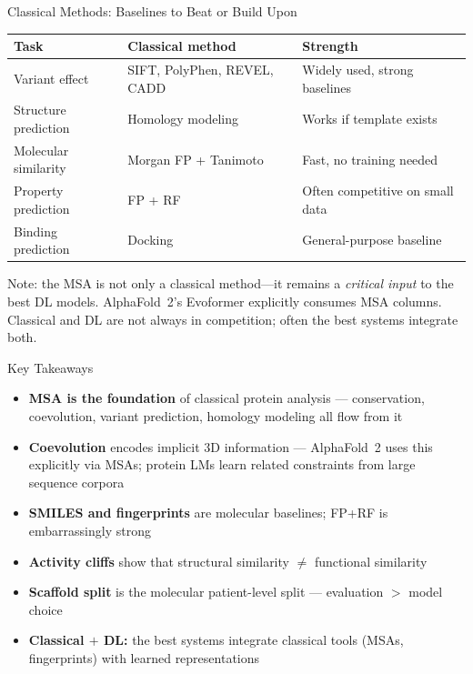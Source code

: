 \documentclass[aspectratio=169,10pt]{beamer}
\begin{document}
\begin{frame}{Classical Methods: Baselines to Beat or Build Upon}

\vspace{0.2em}
\begin{center}
{\footnotesize
\renewcommand{\arraystretch}{1.1}
\begin{tabular}{lll}
\toprule
\textbf{Task} & \textbf{Classical method} & \textbf{Strength} \\
\midrule
Variant effect & SIFT, PolyPhen, REVEL, CADD & Widely used, strong baselines \\
Structure prediction & Homology modeling & Works if template exists \\
Molecular similarity & Morgan FP + Tanimoto & Fast, no training needed \\
Property prediction & FP + RF & Often competitive on small data \\
Binding prediction & Docking & General-purpose baseline \\
\bottomrule
\end{tabular}
}
\end{center}

\pause
\vspace{0.2em}
{\small Note: the MSA is not only a classical method---it remains a \emph{critical input} to the best DL models. AlphaFold~2's Evoformer explicitly consumes MSA columns. Classical and DL are not always in competition; often the best systems integrate both.}
\end{frame}

\begin{frame}{Key Takeaways}
\begin{itemize}[<+->]
    \item \textbf{MSA is the foundation} of classical protein analysis --- conservation, coevolution, variant prediction, homology modeling all flow from it
    \item \textbf{Coevolution} encodes implicit 3D information --- AlphaFold~2 uses this explicitly via MSAs; protein LMs learn related constraints from large sequence corpora
    \item \textbf{SMILES and fingerprints} are molecular baselines; FP+RF is embarrassingly strong
    \item \textbf{Activity cliffs} show that structural similarity $\neq$ functional similarity
    \item \textbf{Scaffold split} is the molecular patient-level split --- evaluation $>$ model choice
    \item \textbf{Classical $+$ DL:} the best systems integrate classical tools (MSAs, fingerprints) with learned representations
\end{itemize}
\end{frame}
\end{document}
